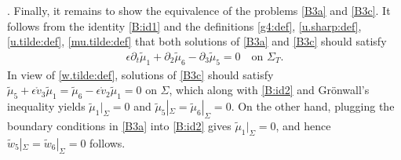\documentclass[twoside,11pt]{article}
\numberwithin{equation}{section}
\def\p{\partial}
\begin{document}
\vspace*{2mm}
.\quad
Finally, it remains to show the equivalence of the problems \eqref{B3a} and \eqref{B3c}.
It follows from the identity \eqref{B:id1} and
the definitions \eqref{g4:def}, \eqref{u.sharp:def}, \eqref{u.tilde:def},  \eqref{mu.tilde:def} that both solutions of \eqref{B3a} and \eqref{B3c} should satisfy
\begin{align} \label{B:id2}%
	\epsilon \p_t\tilde{\mu}_1+\p_2\tilde{\mu}_6-\p_3\tilde{\mu}_5
	=0
	\quad
	\textrm{on }\Sigma_{T}.
\end{align}
In view of \eqref{w.tilde:def},
solutions of \eqref{B3c} should satisfy $\tilde\mu_5+\epsilon \mathring{v}_3 \tilde\mu_1=\tilde\mu_6-\epsilon \mathring{v}_2\tilde\mu_1=0$ on $\Sigma$, which along with \eqref{B:id2} and Gr\"{o}nwall's inequality yields $\tilde{\mu}_1|_{\Sigma}=0$
and  $\tilde{\mu}_5|_{\Sigma}=\tilde{\mu}_6|_{\Sigma}=0$.
On the other hand,
plugging the boundary conditions in \eqref{B3a} into \eqref{B:id2} gives $\tilde{\mu}_1|_{\Sigma}=0$, and hence $\widetilde{w}_5|_{\Sigma}=\widetilde{w}_6|_{\Sigma}=0$ follows.	

	
	
	
	\vspace*{4mm}
	
	
\end{document}
